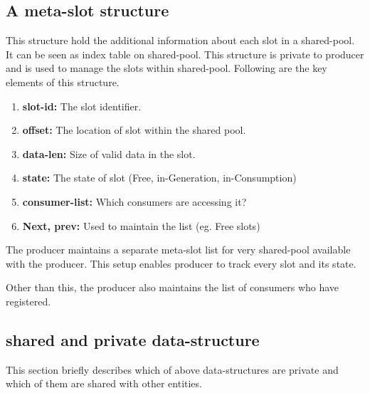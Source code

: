 \documentclass[a4paper,twoside]{report} %
\begin{document}
\subsection{A meta-slot structure}
This structure hold the additional information about each slot in
a shared-pool.  It can be seen as index table on shared-pool.
This structure is private to producer and is used to manage the
slots within shared-pool.  Following are the key elements of 
this structure.
\begin{enumerate} 
  \item \textbf{slot-id:} The slot identifier. 
  \item \textbf{offset:} The location of slot within the shared pool.
  \item \textbf{data-len:} Size of valid data in the slot.
  \item \textbf{state:} The state of slot (Free, in-Generation, 
  in-Consumption)
  \item \textbf{consumer-list:} Which consumers are accessing it? 
  \item \textbf{Next, prev:} Used to maintain the list (eg. Free slots)
\end{enumerate} 

The producer maintains a separate meta-slot list for very shared-pool
available with the producer.  This setup enables producer to track 
every slot and its state.

Other than this, the producer also maintains the list of consumers who
have registered.

\subsection{shared and private data-structure}
This section briefly describes which of above data-structures are
private and which of them are shared with other entities.
\end{document}
